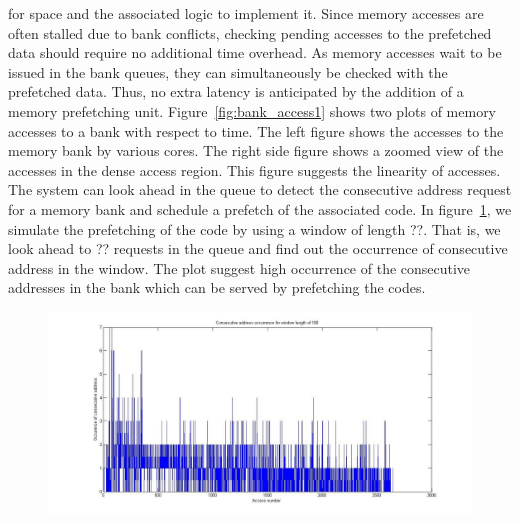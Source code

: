 for space and the associated logic to implement it. Since memory accesses are 
often stalled due to bank conflicts, checking pending accesses to the 
prefetched data should require no additional time overhead. As memory accesses 
wait to be issued in the bank queues, they can simultaneously be checked with 
the prefetched data. Thus, no extra latency is anticipated by the addition of a 
memory prefetching unit.
Figure~\ref{fig:bank_access1} shows two plots of memory accesses to a bank with 
respect to time. The left figure shows the accesses to the memory bank by 
various cores. The right side figure shows a zoomed view of the accesses in the 
dense access region. This figure suggests the linearity of accesses. The system 
can look ahead in the queue to detect the consecutive address request for a 
memory bank and schedule a prefetch of the associated code.  In 
figure~\ref{fig:queue_lookahead}, we simulate the prefetching of the code by 
using a window of length ??. That is, we look ahead to ?? requests in the queue 
and find out the occurrence of consecutive address in the window. The plot 
suggest high occurrence of the consecutive addresses in the bank which can be 
served by prefetching the codes.  
\begin{figure}[htbp]
\centering
\includegraphics[width=\linewidth]{fig/queue_lookahead.jpg}
\caption{ }
\label{fig:queue_lookahead}
\end{figure} 
 
